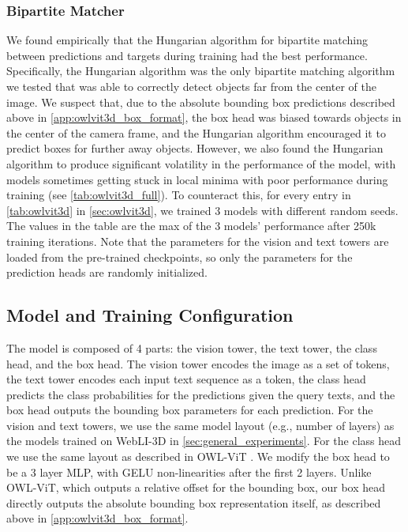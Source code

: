 \subsubsection{Bipartite Matcher}
\label{app:owlvit3d_matcher}

We found empirically that the Hungarian algorithm \citep{kuhn55} for bipartite matching between predictions and targets during training had the best performance.
Specifically, the Hungarian algorithm was the only bipartite matching algorithm we tested that was able to correctly detect objects far from the center of the image.
We suspect that, due to the absolute bounding box predictions described above in \cref{app:owlvit3d_box_format}, the box head was biased towards objects in the center of the camera frame, and the Hungarian algorithm encouraged it to predict boxes for further away objects.
However, we also found the Hungarian algorithm to produce significant volatility in the performance of the model, with models sometimes getting stuck in local minima with poor performance during training (see \cref{tab:owlvit3d_full}).
To counteract this, for every entry in \cref{tab:owlvit3d} in \cref{sec:owlvit3d}, we trained 3 models with different random seeds.
The values in the table are the max of the 3 models' performance after 250k training iterations.
Note that the parameters for the vision and text towers are loaded from the pre-trained checkpoints, so only the parameters for the prediction heads are randomly initialized.

\subsection{Model and Training Configuration}

The model is composed of 4 parts: the vision tower, the text tower, the class head, and the box head. 
The vision tower encodes the image as a set of tokens, the text tower encodes each input text sequence as a token, the class head predicts the class probabilities for the predictions given the query texts, and the box head outputs the bounding box parameters for each prediction.
For the vision and text towers, we use the same model layout (e.g., number of layers) as the models trained on WebLI-3D in \cref{sec:general_experiments}.
For the class head we use the same layout as described in OWL-ViT \citep{minderer2022simple}.
We modify the box head to be a 3 layer MLP, with GELU \citep{hendrycks2016} non-linearities after the first 2 layers.
Unlike OWL-ViT, which outputs a relative offset for the bounding box, our box head directly outputs the absolute bounding box representation itself, as described above in \cref{app:owlvit3d_box_format}.

